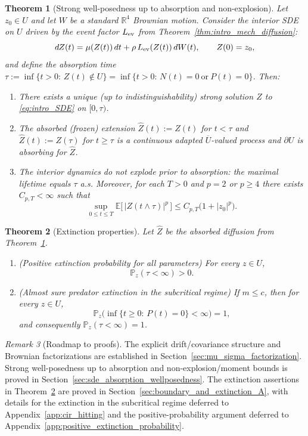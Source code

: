 \documentclass[pdflatex,sn-mathphys-ay]{sn-jnl}
\theoremstyle{thmstyleone}
\newtheorem{theorem}{Theorem}[section]
\theoremstyle{definition}
\theoremstyle{remark}
\newtheorem{remark}[theorem]{Remark}
\begin{document}
\begin{theorem}[Strong well-posedness up to absorption and non-explosion]\label{thm:intro_wellposed_nonexplosion}
Let $z_0\in U$ and let $W$ be a standard $\mathbb{R}^4$ Brownian motion.
Consider the interior SDE on $U$ driven by the event factor $L_{\rm ev}$ from
Theorem~\ref{thm:intro_mech_diffusion}:
\begin{equation}\label{eq:intro_SDE}
dZ(t)=\mu(Z(t))\,dt+\rho\,L_{\rm ev}(Z(t))\,dW(t),\qquad Z(0)=z_0,
\end{equation}
and define the absorption time $\tau:=\inf\{t>0:\,Z(t)\notin U\}=\inf\{t>0:\,N(t)=0\ \text{or}\ P(t)=0\}$.
Then:
\begin{enumerate}
\item[(i)] There exists a unique (up to indistinguishability) strong solution $Z$ to \eqref{eq:intro_SDE} on $[0,\tau)$.
\item[(ii)] The absorbed (frozen) extension $\widehat Z(t):=Z(t)$ for $t<\tau$ and $\widehat Z(t):=Z(\tau)$ for $t\ge\tau$
is a continuous adapted $\overline U$-valued process and $\partial U$ is absorbing for $\widehat Z$.
\item[(iii)] The interior dynamics do not explode prior to absorption: the maximal lifetime equals $\tau$ a.s.
Moreover, for each $T>0$ and $p=2$ or $p\ge 4$ there exists $C_{p,T}<\infty$ such that
\[
\sup_{0\le t\le T}\mathbb{E}\bigl[\,|Z(t\wedge\tau)|^p\,\bigr]\le C_{p,T}\bigl(1+|z_0|^p\bigr).
\]
\end{enumerate}
\end{theorem}

\begin{theorem}[Extinction properties]\label{thm:intro_extinction}
Let $\widehat Z$ be the absorbed diffusion from Theorem~\ref{thm:intro_wellposed_nonexplosion}.
\begin{enumerate}
\item[(i)] (Positive extinction probability for all parameters)
For every $z\in U$,
\[
\mathbb{P}_z(\tau<\infty)>0.
\]
\item[(ii)] (Almost sure predator extinction in the subcritical regime)
If $m\le c$, then for every $z\in U$,
\[
\mathbb{P}_z\bigl(\inf\{t\ge0:\,P(t)=0\}<\infty\bigr)=1,
\]
and consequently $\mathbb{P}_z(\tau<\infty)=1$.
\end{enumerate}
\end{theorem}

\begin{remark}[Roadmap to proofs]
The explicit drift/covariance structure and Brownian factorizations are established in
Section~\ref{sec:mu_sigma_factorization}.
Strong well-posedness up to absorption and non-explosion/moment bounds is proved in
Section~\ref{sec:sde_absorption_wellposedness}.
The extinction assertions in Theorem~\ref{thm:intro_extinction} are proved in
Section~\ref{sec:boundary_and_extinction_A}, with details for the extinction in the subcritical regime deferred to Appendix~\ref{app:cir_hitting} and the positive-probability argument deferred to
Appendix~\ref{app:positive_extinction_probability}.
\end{remark}
\end{document}
